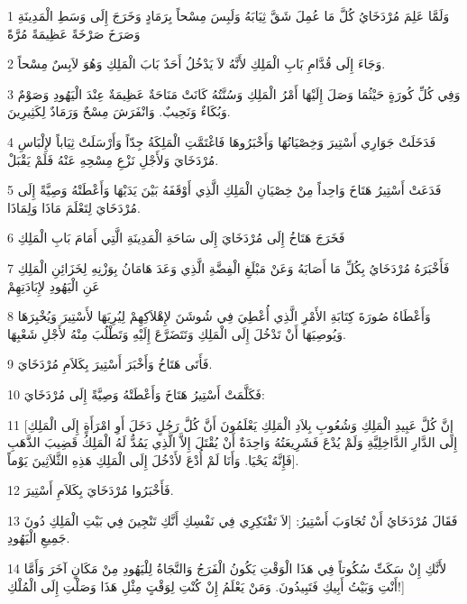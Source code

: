 \par 1 وَلَمَّا عَلِمَ مُرْدَخَايُ كُلَّ مَا عُمِلَ شَقَّ ثِيَابَهُ وَلَبِسَ مِسْحاً بِرَمَادٍ وَخَرَجَ إِلَى وَسَطِ الْمَدِينَةِ وَصَرَخَ صَرْخَةً عَظِيمَةً مُرَّةً
\par 2 وَجَاءَ إِلَى قُدَّامِ بَابِ الْمَلِكِ لأَنَّهُ لاَ يَدْخُلُ أَحَدٌ بَابَ الْمَلِكِ وَهُوَ لاَبِسٌ مِسْحاً.
\par 3 وَفِي كُلِّ كُورَةٍ حَيْثُمَا وَصَلَ إِلَيْهَا أَمْرُ الْمَلِكِ وَسُنَّتُهُ كَانَتْ مَنَاحَةٌ عَظِيمَةٌ عِنْدَ الْيَهُودِ وَصَوْمٌ وَبُكَاءٌ وَنَحِيبٌ. وَانْفَرَشَ مِسْحٌ وَرَمَادٌ لِكَثِيرِينَ.
\par 4 فَدَخَلَتْ جَوَارِي أَسْتِيرَ وَخِصْيَانُهَا وَأَخْبَرُوهَا فَاغْتَمَّتِ الْمَلِكَةُ جِدّاً وَأَرْسَلَتْ ثِيَاباً لإِلْبَاسِ مُرْدَخَايَ وَلأَجْلِ نَزْعِ مِسْحِهِ عَنْهُ فَلَمْ يَقْبَلْ.
\par 5 فَدَعَتْ أَسْتِيرُ هَتَاخَ وَاحِداً مِنْ خِصْيَانِ الْمَلِكِ الَّذِي أَوْقَفَهُ بَيْنَ يَدَيْهَا وَأَعْطَتْهُ وَصِيَّةً إِلَى مُرْدَخَايَ لِتَعْلَمَ مَاذَا وَلِمَاذَا.
\par 6 فَخَرَجَ هَتَاخُ إِلَى مُرْدَخَايَ إِلَى سَاحَةِ الْمَدِينَةِ الَّتِي أَمَامَ بَابِ الْمَلِكِ
\par 7 فَأَخْبَرَهُ مُرْدَخَايُ بِكُلِّ مَا أَصَابَهُ وَعَنْ مَبْلَغِ الْفِضَّةِ الَّذِي وَعَدَ هَامَانُ بِوَزْنِهِ لِخَزَائِنِ الْمَلِكِ عَنِ الْيَهُودِ لإِبَادَتِهِمْ
\par 8 وَأَعْطَاهُ صُورَةَ كِتَابَةِ الأَمْرِ الَّذِي أُعْطِيَ فِي شُوشَنَ لإِهْلاَكِهِمْ لِيُرِيَهَا لأَسْتِيرَ وَيُخْبِرَهَا وَيُوصِيَهَا أَنْ تَدْخُلَ إِلَى الْمَلِكِ وَتَتَضَرَّعَ إِلَيْهِ وَتَطْلُبَ مِنْهُ لأَجْلِ شَعْبِهَا.
\par 9 فَأَتَى هَتَاخُ وَأَخْبَرَ أَسْتِيرَ بِكَلاَمِ مُرْدَخَايَ.
\par 10 فَكَلَّمَتْ أَسْتِيرُ هَتَاخَ وَأَعْطَتْهُ وَصِيَّةً إِلَى مُرْدَخَايَ:
\par 11 [إِنَّ كُلَّ عَبِيدِ الْمَلِكِ وَشُعُوبِ بِلاَدِ الْمَلِكِ يَعْلَمُونَ أَنَّ كُلَّ رَجُلٍ دَخَلَ أَوِ امْرَأَةٍ إِلَى الْمَلِكِ إِلَى الدَّارِ الدَّاخِلِيَّةِ وَلَمْ يُدْعَ فَشَرِيعَتُهُ وَاحِدَةٌ أَنْ يُقْتَلَ إِلاَّ الَّذِي يَمُدُّ لَهُ الْمَلِكُ قَضِيبَ الذَّهَبِ فَإِنَّهُ يَحْيَا. وَأَنَا لَمْ أُدْعَ لأَدْخُلَ إِلَى الْمَلِكِ هَذِهِ الثَّلاَثِينَ يَوْماً].
\par 12 فَأَخْبَرُوا مُرْدَخَايَ بِكَلاَمِ أَسْتِيرَ.
\par 13 فَقَالَ مُرْدَخَايُ أَنْ تُجَاوَبَ أَسْتِيرُ: [لاَ تَفْتَكِرِي فِي نَفْسِكِ أَنَّكِ تَنْجِينَ فِي بَيْتِ الْمَلِكِ دُونَ جَمِيعِ الْيَهُودِ.
\par 14 لأَنَّكِ إِنْ سَكَتِّ سُكُوتاً فِي هَذَا الْوَقْتِ يَكُونُ الْفَرَجُ وَالنَّجَاةُ لِلْيَهُودِ مِنْ مَكَانٍ آخَرَ وَأَمَّا أَنْتِ وَبَيْتُ أَبِيكِ فَتَبِيدُونَ. وَمَنْ يَعْلَمُ إِنْ كُنْتِ لِوَقْتٍ مِثْلِ هَذَا وَصَلْتِ إِلَى الْمُلْكِ!]
